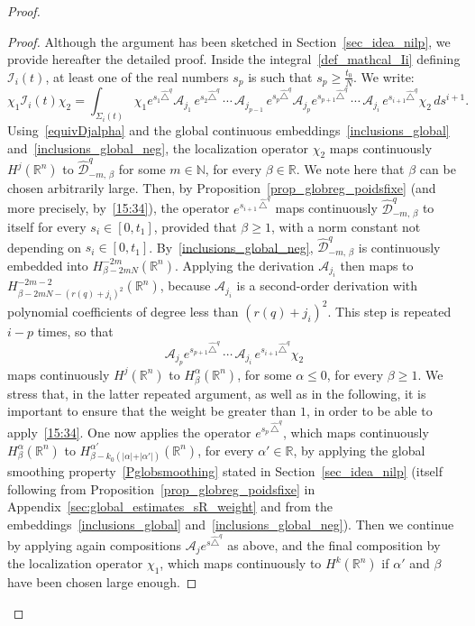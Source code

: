 \documentclass[AHL,Unicode,published]{cedram}
\newcommand*\R{\mathbb{R}}
\newcommand*\N{\mathbb{N}}
\newcommand{\calA}{\mathcal{A}}
\newcommand{\calI}{\mathcal{I}}
\newcommand{\calD}{\mathcal{D}}
\renewcommand{\geq}{\geqslant}
\renewcommand{\leq}{\leqslant}
\begin{document}
\begin{proof}
\begin{proof}
Although the argument has been sketched in Section~\ref{sec_idea_nilp}, we provide hereafter the detailed proof. Inside the integral~\eqref{def_mathcal_Ii} defining $\calI_i(t)$, at least one of the real numbers $s_p$ is such that $s_p\geq \frac{t_0}{N}$. We write:
\[
\chi_1\calI_i(t)\chi_2 = \int_{\Sigma_i(t)} \chi_1 e^{s_1 \widehat{\triangle}^{q}} \calA_{j_1} \, e^{s_2 \widehat{\triangle}^{q}}\,\cdots\,\calA_{j_{p-1}} \, e^{s_p \widehat{\triangle}^{q}} \calA_{j_p} e^{s_{p+1} \widehat{\triangle}^{q}}\,\cdots\,\calA_{j_i} \, e^{s_{i+1} \widehat{\triangle}^{q}} \chi_2 \, ds^{i+1}.
\]
Using~\eqref{equivDjalpha} and the global continuous embeddings~\eqref{inclusions_global} and~\eqref{inclusions_global_neg}, the localization operator $\chi_2$ maps continuously $H^j(\R^n)$ to $\widehat{\calD}^{q}_{-m,\,\beta}$ for some $m\in\N$, for every $\beta\in\R$. We note here that $\beta$ can be chosen arbitrarily large. Then, by Proposition~\ref{prop_globreg_poidsfixe} (and more precisely, by~\eqref{15:34}), the operator $e^{s_{i+1} \,\widehat{\triangle}^{q}}$ maps continuously $\widehat{\calD}^{q}_{-m,\,\beta}$ to itself for every $s_i\in[0,t_1]$, provided that $\beta\geq 1$, with a norm constant not depending on $s_i\in[0,t_1]$. By~\eqref{inclusions_global_neg}, $\widehat{\calD}^{q}_{-m,\,\beta}$ is continuously embedded into $H^{-2m}_{\beta-2mN}(\R^n)$. Applying the derivation $\calA_{j_i}$ then maps to $H^{-2m-2}_{\beta-2mN-(r(q)+j_i)^2}(\R^n)$, because $\calA_{j_i}$ is a second-order derivation with polynomial coefficients of degree less than $(r(q)+j_i)^2$. This step is repeated $i-p$ times, so that
\[
\calA_{j_p} e^{s_{p+1} \widehat{\triangle}^{q}}\,\cdots
\,\calA_{j_i} \, e^{s_{i+1} \widehat{\triangle}^{q}} \chi_2
\]
maps continuously $H^j(\R^n)$ to $H^\alpha_\beta(\R^n)$, for some $\alpha\leq 0$, for every $\beta\geq 1$. We stress that, in the latter repeated argument, as well as in the following, it is important to ensure that the weight be greater than $1$, in order to be able to apply~\eqref{15:34}. One now applies the operator $e^{s_p\,\widehat{\triangle}^{q}}$, which maps continuously $H^{\alpha}_{\beta}(\R^n)$ to $H^{\alpha'}_{\beta-k_0(\vert\alpha\vert+\vert\alpha'\vert)}(\R^n)$, for every $\alpha'\in\R$, by applying the global smoothing property~\eqref{Pglobsmoothing} stated in Section~\ref{sec_idea_nilp} (itself following from Proposition~\ref{prop_globreg_poidsfixe} in Appendix~\ref{sec:global_estimates_sR_weight} and from the embeddings~\eqref{inclusions_global} and~\eqref{inclusions_global_neg}). Then we continue by applying again compositions $\calA_j e^{s\widehat{\triangle}^q}$ as above, and the final composition by the localization operator $\chi_1$, which maps continuously to $H^k(\R^n)$ if $\alpha'$ and $\beta$ have been chosen large enough.
\end{proof}


\end{proof}
\end{document}
